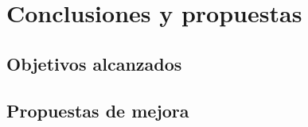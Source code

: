 
\chapter{Conclusiones y propuestas}
\section{Objetivos alcanzados}
\section{Propuestas de mejora}


